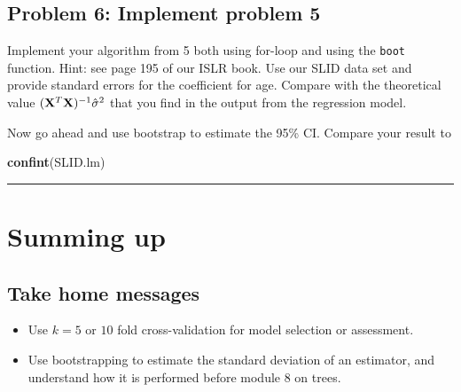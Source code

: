 \documentclass[]{article}
\newenvironment{Shaded}{\begin{snugshade}}{\end{snugshade}}
\newcommand{\KeywordTok}[1]{\textcolor[rgb]{0.13,0.29,0.53}{\textbf{#1}}}
\newcommand{\DataTypeTok}[1]{\textcolor[rgb]{0.13,0.29,0.53}{#1}}
\newcommand{\DecValTok}[1]{\textcolor[rgb]{0.00,0.00,0.81}{#1}}
\newcommand{\StringTok}[1]{\textcolor[rgb]{0.31,0.60,0.02}{#1}}
\newcommand{\OperatorTok}[1]{\textcolor[rgb]{0.81,0.36,0.00}{\textbf{#1}}}
\newcommand{\NormalTok}[1]{#1}
\providecommand{\tightlist}{%
  \setlength{\itemsep}{0pt}\setlength{\parskip}{0pt}}
\begin{document}
\subsection{Problem 6: Implement problem
5}\label{problem-6-implement-problem-5}

Implement your algorithm from 5 both using for-loop and using the
\texttt{boot} function. Hint: see page 195 of our ISLR book. Use our
SLID data set and provide standard errors for the coefficient for age.
Compare with the theoretical value
\(({\bf X}^T{\bf X})^{-1}\hat{\sigma}^2\) that you find in the output
from the regression model.

\begin{Shaded}
\end{Shaded}

Now go ahead and use bootstrap to estimate the 95\% CI. Compare your
result to

\begin{Shaded}
\begin{Highlighting}[]
\KeywordTok{confint}\NormalTok{(SLID.lm)}
\end{Highlighting}
\end{Shaded}

\begin{center}\rule{0.5\linewidth}{\linethickness}\end{center}

\section{Summing up}\label{summing-up}

\subsection{Take home messages}\label{take-home-messages}

\begin{itemize}
\tightlist
\item
  Use \(k=5\) or \(10\) fold cross-validation for model selection or
  assessment.
\item
  Use bootstrapping to estimate the standard deviation of an estimator,
  and understand how it is performed before module 8 on trees.
\end{itemize}
\end{document}
